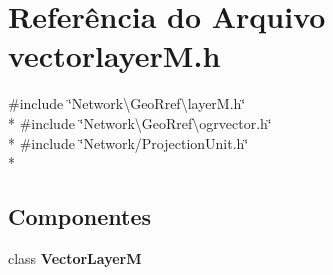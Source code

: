 \section{Referência do Arquivo vectorlayer\+M.\+h}
\label{vectorlayer_m_8h}
{\ttfamily \#include \char`\"{}Network\textbackslash{}\+Geo\+Rref\textbackslash{}layer\+M.\+h\char`\"{}}\\*
{\ttfamily \#include \char`\"{}Network\textbackslash{}\+Geo\+Rref\textbackslash{}ogrvector.\+h\char`\"{}}\\*
{\ttfamily \#include \char`\"{}Network/\+Projection\+Unit.\+h\char`\"{}}\\*
\subsection*{Componentes}
\begin{DoxyCompactItemize}
\item 
class {\bf Vector\+LayerM}
\end{DoxyCompactItemize}
